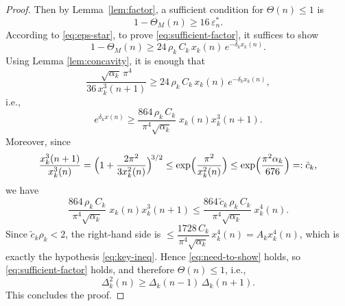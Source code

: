 \documentclass[10pt,a4paper]{amsart}
\begin{document}
\begin{proof}
Then by Lemma~\ref{lem:factor}, a sufficient condition for
\(
\Theta(n)\le 1
\)
is
\begin{equation}\label{eq:sufficient-factor}
1-\Theta_M(n) \ge 16\,\varepsilon_n^\ast.
\end{equation}
According to \eqref{eq:eps-star}, to prove \eqref{eq:sufficient-factor}, it suffices to show
\begin{equation}\label{eq:need-to-show}
1-\Theta_M(n) \ge 24\,\rho_k\,C_k\, x_k(n)\, e^{-\delta_k x_k(n)}.
\end{equation}
Using Lemma \ref{lem:concavity}, it is enough that
\[
\frac{\sqrt{\alpha_k}\,\pi^4}{36\,x_k^3(n+1)} \ge 24\,\rho_k\,C_k\, x_k(n)\, e^{-\delta_k x_k(n)},
\]
i.e.,
\[
e^{\delta_k x(n)}\ge \frac{864\,\rho_k\,C_k}{\pi^4\sqrt{\alpha_k}}\;x_k(n)x_k^3(n+1).
\]
Moreover, since
\[
\frac{x_k^3(n+1)}{x_k^3(n)}
=\Bigl(1+\frac{2\pi^2}{3x_k^2(n)}\Bigr)^{\!3/2}
\le \exp\Bigl(\frac{\pi^2}{x_k^2(n)}\Bigr)
\le \exp\Bigl(\frac{\pi^2\alpha_k}{676}\Bigr)=:\tilde{c}_k,
\]
we have
\[
\frac{864\,\rho_k\,C_k}{\pi^4\sqrt{\alpha_k}}\;x_k(n)x_k^3(n+1) \le \frac{864\,\tilde{c}_k\,\rho_k\,C_k}{\pi^4\sqrt{\alpha_k}}\;x_k^4(n).
\]
Since \(\tilde{c}_k\rho_k<2\), the right-hand side is $\le \dfrac{1728\,C_k}{\pi^4\sqrt{\alpha_k}}\,x_k^4(n)=A_k x_k^4(n)$, which is exactly the hypothesis \eqref{eq:key-ineq}. Hence \eqref{eq:need-to-show} holds, so \eqref{eq:sufficient-factor} holds, and therefore \(\Theta(n)\le 1\), i.e.,
\[
\Delta_k^2(n) \ge \Delta_k(n-1)\,\Delta_k(n+1).
\]
This concludes the proof.
\end{proof}
\end{document}
